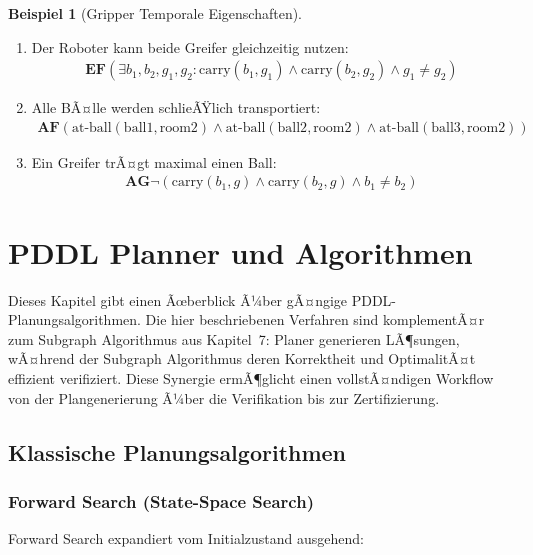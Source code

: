 ﻿\documentclass[a4paper,12pt]{article}
\theoremstyle{definition}
\newtheorem{beispiel}{Beispiel}[section]
\begin{document}
\begin{beispiel}[Gripper Temporale Eigenschaften]
	\begin{enumerate}
		\item Der Roboter kann beide Greifer gleichzeitig nutzen:
		\begin{align}
		\mathbf{EF}(\exists b_1, b_2, g_1, g_2: \text{carry}(b_1, g_1) \land \text{carry}(b_2, g_2) \land g_1 \neq g_2)
		\end{align}
		
		\item Alle BÃ¤lle werden schlieÃŸlich transportiert:
		\begin{align}
		\mathbf{AF}(\text{at-ball}(\text{ball1}, \text{room2}) \land \text{at-ball}(\text{ball2}, \text{room2}) \land \text{at-ball}(\text{ball3}, \text{room2}))
		\end{align}
		
		\item Ein Greifer trÃ¤gt maximal einen Ball:
		\begin{align}
		\mathbf{AG}\neg(\text{carry}(b_1, g) \land \text{carry}(b_2, g) \land b_1 \neq b_2)
		\end{align}
	\end{enumerate}
\end{beispiel}

\section{PDDL Planner und Algorithmen}

Dieses Kapitel gibt einen Ãœberblick Ã¼ber gÃ¤ngige PDDL-Planungsalgorithmen. Die hier beschriebenen Verfahren sind komplementÃ¤r zum Subgraph Algorithmus aus Kapitel~7: Planer generieren LÃ¶sungen, wÃ¤hrend der Subgraph Algorithmus deren Korrektheit und OptimalitÃ¤t effizient verifiziert. Diese Synergie ermÃ¶glicht einen vollstÃ¤ndigen Workflow von der Plangenerierung Ã¼ber die Verifikation bis zur Zertifizierung.

\subsection{Klassische Planungsalgorithmen}

\subsubsection{Forward Search (State-Space Search)}

Forward Search expandiert vom Initialzustand ausgehend:
\end{document}
